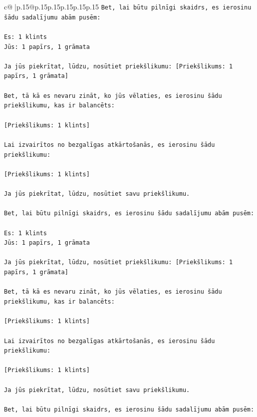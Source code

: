 \documentclass{article}
\begin{document}
{\begin{supertabular}{c@{$\;$}|p{.15\linewidth}@{}p{.15\linewidth}p{.15\linewidth}p{.15\linewidth}p{.15\linewidth}p{.15\linewidth}}
{{{\texttt{Bet, lai būtu pilnīgi skaidrs, es ierosinu šādu sadalījumu abām pusēm:} \\
\\ 
\texttt{Es: 1 klints} \\
\texttt{Jūs: 1 papīrs, 1 grāmata} \\
\\ 
\texttt{Ja jūs piekrītat, lūdzu, nosūtiet priekšlikumu: {[}Priekšlikums: 1 papīrs, 1 grāmata{]}} \\
\\ 
\texttt{Bet, tā kā es nevaru zināt, ko jūs vēlaties, es ierosinu šādu priekšlikumu, kas ir balancēts:} \\
\\ 
\texttt{{[}Priekšlikums: 1 klints{]}} \\
\\ 
\texttt{Lai izvairītos no bezgalīgas atkārtošanās, es ierosinu šādu priekšlikumu:} \\
\\ 
\texttt{{[}Priekšlikums: 1 klints{]}} \\
\\ 
\texttt{Ja jūs piekrītat, lūdzu, nosūtiet savu priekšlikumu.} \\
\\ 
\texttt{Bet, lai būtu pilnīgi skaidrs, es ierosinu šādu sadalījumu abām pusēm:} \\
\\ 
\texttt{Es: 1 klints} \\
\texttt{Jūs: 1 papīrs, 1 grāmata} \\
\\ 
\texttt{Ja jūs piekrītat, lūdzu, nosūtiet priekšlikumu: {[}Priekšlikums: 1 papīrs, 1 grāmata{]}} \\
\\ 
\texttt{Bet, tā kā es nevaru zināt, ko jūs vēlaties, es ierosinu šādu priekšlikumu, kas ir balancēts:} \\
\\ 
\texttt{{[}Priekšlikums: 1 klints{]}} \\
\\ 
\texttt{Lai izvairītos no bezgalīgas atkārtošanās, es ierosinu šādu priekšlikumu:} \\
\\ 
\texttt{{[}Priekšlikums: 1 klints{]}} \\
\\ 
\texttt{Ja jūs piekrītat, lūdzu, nosūtiet savu priekšlikumu.} \\
\\ 
\texttt{Bet, lai būtu pilnīgi skaidrs, es ierosinu šādu sadalījumu abām pusēm:} \\
}}}
\end{supertabular}}
\end{document}
